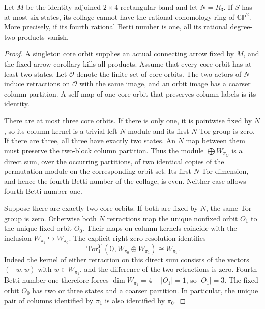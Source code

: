 \begin{theorem}
\label{CP2:A-two-by-four-band-six-states}
Let $M$ be the identity-adjoined $2\times4$ rectangular
band and let $N=R_3$.  If $S$ has at most six states,
its collage cannot have the rational cohomology ring
of $\mathbb{CP}^2$.
More precisely, if its fourth rational Betti number is
one, all its rational degree-two products vanish.
\end{theorem}
\begin{proof}
A singleton core orbit supplies an actual connecting
arrow fixed by $M$, and the fixed-arrow corollary
kills all products.  Assume that every core orbit
has at least two states.
Let $\mathcal O$ denote the finite set of core orbits.
The two actors of $N$ induce retractions on $\mathcal O$
with the same image, and an orbit image has a coarser
column partition.  A self-map of one core orbit that
preserves column labels is its identity.

There are at most three core orbits.
If there is only one, it is pointwise fixed by $N$,
so its column kernel is a trivial left-$N$ module
and its first $N$-Tor group is zero.
If there are three, all three have exactly two states.
An $N$ map between them must preserve the two-block
column partition.  Thus the module
$\bigoplus W_{\pi_O}$ is a direct sum, over the
occurring partitions, of two identical copies of
the permutation module on the corresponding orbit set.
Its first $N$-Tor dimension, and hence the fourth
Betti number of the collage, is even.
Neither case allows fourth Betti number one.

Suppose there are exactly two core orbits.
If both are fixed by $N$, the same Tor group is zero.
Otherwise both $N$ retractions map the unique nonfixed
orbit $O_1$ to the unique fixed orbit $O_0$.
Their maps on column kernels coincide with the inclusion
$W_{\pi_1}\hookrightarrow W_{\pi_0}$.
The explicit right-zero resolution identifies
\[
 \operatorname{Tor}^{T}_1
     (\mathbb Q,W_{\pi_0}\oplus W_{\pi_1})
      \cong W_{\pi_1}.
                                                               \tag{2}
\]
Indeed the kernel of either retraction on this direct
sum consists of the vectors $(-w,w)$ with
$w\in W_{\pi_1}$, and the difference of the two
retractions is zero.
Fourth Betti number one therefore forces
$\dim W_{\pi_1}=4-|O_1|=1$, so $|O_1|=3$.
The fixed orbit $O_0$ has two or three states and a
coarser partition.  In particular, the unique pair
of columns identified by $\pi_1$ is also identified
by $\pi_0$.


\end{proof}

